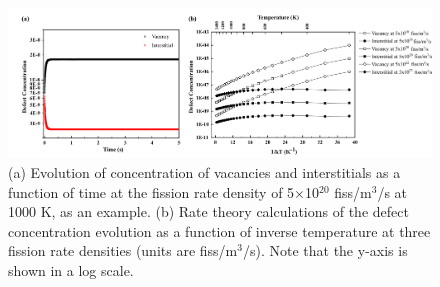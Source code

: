 \documentclass[preprint,12pt]{elsarticle}
\begin{document}
\begin{figure}[hbt!]
\centering
\includegraphics[width=1\textwidth]{Fig3.png}
\caption{(a) Evolution of concentration of vacancies and interstitials as a function of time at the fission rate density of 5$\times$10$^{20}$ fiss/m$^{3}$/s at 1000 K, as an example. (b) Rate theory calculations of the defect concentration evolution as a function of inverse temperature at three fission rate densities (units are fiss/m$^{3}$/s). Note that the y-axis is shown in a log scale.}
\label{fig:def_conc}
\end{figure}
\end{document}
